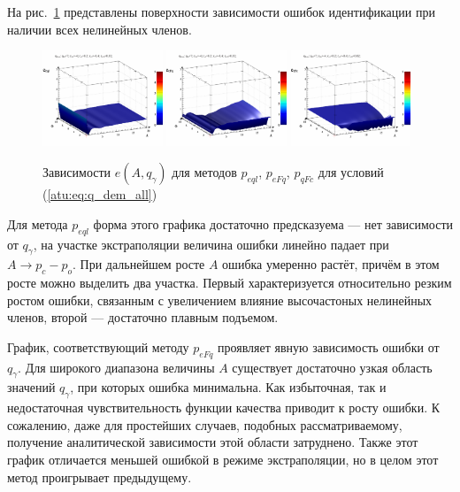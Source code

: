 На рис.~\ref{atu:f:qsl_pe_A_qg_all} представлены поверхности зависимости ошибок идентификации
при наличии всех нелинейных членов.


\begin{figure}[htb!]
  \centerline{
    \includegraphics[width=0.32\textwidth]{p/qls_pe-p_A_qg_eql_all.png}
    \hfill
    \includegraphics[width=0.32\textwidth]{p/qls_pe-p_A_qg_eFq_all.png}
    \hfill
    \includegraphics[width=0.32\textwidth]{p/qls_pe-p_A_qg_eFc_all.png}
  }
  \caption{Зависимости $e(A,q_\gamma)$ для методов $p_{eql}$, $p_{eFq}$, $p_{qFc}$ для условий (\ref{atu:eq:q_dem_all})}
  \label{atu:f:qsl_pe_A_qg_all}
\end{figure}

Для метода $p_{eql}$
форма этого графика достаточно предсказуема --- нет зависимости от $q_\gamma$,
на участке экстраполяции величина ошибки линейно падает при $A \to p_c - p_o$. При дальнейшем росте $A$
ошибка умеренно растёт, причём в этом росте можно выделить два участка.
Первый характеризуется относительно резким ростом ошибки, связанным
с увеличением влияние высочастоных нелинейных членов,
второй --- достаточно плавным подъемом.

График, соответствующий методу $p_{eFq}$ проявляет явную зависимость
ошибки от $q_\gamma$. Для широкого диапазона величины $A$
существует достаточно узкая область значений $q_\gamma$,
при которых ошибка минимальна. Как избыточная, так и недостаточная чувствительность
функции качества приводит к росту ошибки. К сожалению,
даже для простейших случаев, подобных рассматриваемому,
получение аналитической зависимости этой области затруднено.
Также этот график отличается меньшей ошибкой в режиме экстраполяции,
но в целом этот метод проигрывает предыдущему.

